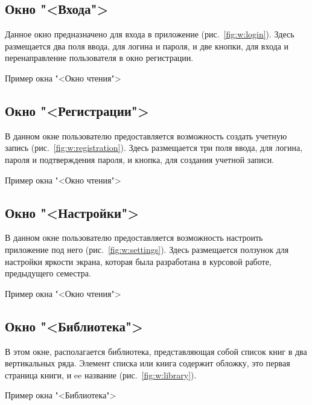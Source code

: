 \subsection{Окно "<Входа">}
Данное окно предназначено для входа в приложение (рис.~\ref{fig:w:login}).
Здесь размещается два поля ввода, для логина и пароля, и две кнопки,
для входа и перенаправление пользователя в окно регистрации.

\begin{image}
	\caption{Пример окна "<Окно чтения">}
	\label{fig:w:login}
\end{image}

\subsection{Окно "<Регистрации">}
В данном окне пользователю предоставляется возможность создать учетную запись
(рис.~\ref{fig:w:registration}).
Здесь размещается три поля ввода, для логина, пароля и подтверждения пароля,
и кнопка, для создания учетной записи.

\begin{image}
	\caption{Пример окна "<Окно чтения">}
	\label{fig:w:registration}
\end{image}

\subsection{Окно "<Настройки">}
В данном окне пользователю предоставляется возможность настроить
приложение под него (рис.~\ref{fig:w:settings}).
Здесь размещается ползунок для настройки яркости экрана,
которая была разработана в курсовой работе, предыдущего семестра.

\begin{image}
	\caption{Пример окна "<Окно чтения">}
	\label{fig:w:settings}
\end{image}

\subsection{Окно "<Библиотека">}
В этом окне, располагается библиотека, представляющая собой
список книг в два вертикальных ряда.
Элемент списка или книга содержит обложку, это первая страница книги, и
ee название (рис.~\ref{fig:w:library}).

\begin{image}
	\caption{Пример окна "<Библиотека">}
	\label{fig:w:library}
\end{image}

